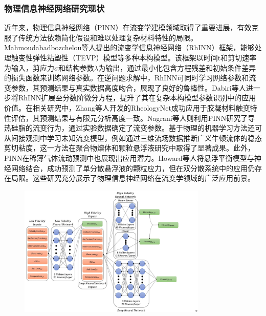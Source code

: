 \subsubsection{物理信息神经网络研究现状}
近年来，物理信息神经网络（PINN）在流变学建模领域取得了重要进展，有效克服了传统方法依赖简化假设和难以处理复杂材料特性的局限。Mahmoudabadbozchelou等人提出的流变学信息神经网络（RhINN）框架，能够处理触变性弹性粘塑性（TEVP）模型等多种本构模型\cite{mahmoudabadbozchelouRheologyInformedNeuralNetworks2021}。该框架以时间t和剪切速率为输入，剪应力$\sigma$和结构参数$\lambda$为输出，通过最小化包含方程残差和初始条件差异的损失函数来训练网络参数。在逆问题求解中，RhINN可同时学习网络参数和流变参数，其预测结果与真实数据高度吻合，展现了良好的鲁棒性。Dabiri等人进一步将RhINN扩展至分数阶微分方程，提升了其在复杂本构模型参数识别中的应用价值\cite{dabiri2023}。在相关研究中，Zhang等人开发的RheologyNet成功应用于胶凝材料触变特性评估，其预测结果与有限元分析高度一致\cite{zhangRheologyNetPhysicsinformedNeural2023}。Nagrani等人则利用PINN研究了导热硅脂的流变行为，通过实验数据确定了流变参数\cite{nagrani2023}。基于物理的机器学习方法还可从间接观测中学习未知流变模型，例如通过三维流场数据推断广义牛顿流体的稳态剪切粘度，这一方法在聚合物熔体和颗粒悬浮液研究中取得了显著成果。此外，PINN在稀薄气体流动预测中也展现出应用潜力\cite{tucnyLearningViscosityFunctions2024}。Howard等人将悬浮平衡模型与神经网络结合，成功预测了单分散悬浮液的颗粒应力，但在双分散系统中的应用仍存在局限。这些研究充分展示了物理信息神经网络在流变学领域的广泛应用前景\cite{howardMachineLearningMethods2023}。
\begin{figure}[htbp]
	\centering
	\includegraphics[width=0.8\textwidth]{Fig/MFNN.png}
\end{figure}

